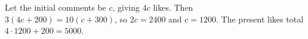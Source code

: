 Let the initial comments be $ c $, giving $ 4c $ likes. Then $ 3(4c+200)=10(c+300)$, so $ 2c=2400 $ and $ c=1200 $. The present likes total $ 4\cdot1200+200=\boxed{5000}$.
